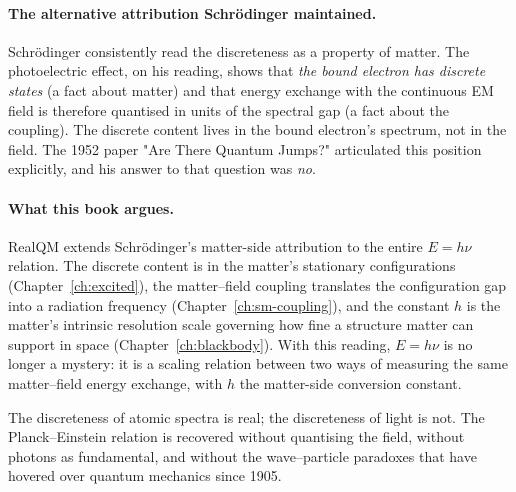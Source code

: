 \paragraph{The alternative attribution Schr\"odinger maintained.}
Schr\"odinger consistently read the discreteness as a property of matter. The photoelectric effect, on his reading, shows that \emph{the bound electron has discrete states} (a fact about matter) and that energy exchange with the continuous EM field is therefore quantised in units of the spectral gap (a fact about the coupling). The discrete content lives in the bound electron's spectrum, not in the field. The 1952 paper "Are There Quantum Jumps?" articulated this position explicitly, and his answer to that question was \emph{no}.

\paragraph{What this book argues.}
RealQM extends Schr\"odinger's matter-side attribution to the entire $E = h\nu$ relation. The discrete content is in the matter's stationary configurations (Chapter~\ref{ch:excited}), the matter--field coupling translates the configuration gap into a radiation frequency (Chapter~\ref{ch:sm-coupling}), and the constant $h$ is the matter's intrinsic resolution scale governing how fine a structure matter can support in space (Chapter~\ref{ch:blackbody}). With this reading, $E = h\nu$ is no longer a mystery: it is a scaling relation between two ways of measuring the same matter--field energy exchange, with $h$ the matter-side conversion constant.

The discreteness of atomic spectra is real; the discreteness of light is not. The Planck--Einstein relation is recovered without quantising the field, without photons as fundamental, and without the wave--particle paradoxes that have hovered over quantum mechanics since 1905.

